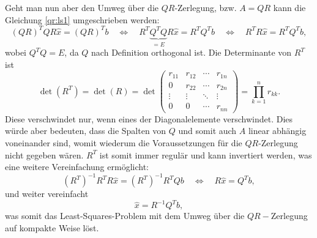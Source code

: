Geht man nun aber den Umweg über die $QR$-Zerlegung, bzw. $A=QR$ kann die Gleichung \ref{qr:ls1} umgeschrieben werden:
\begin{equation*}
(QR)^TQR\hat{x}=(QR)^Tb \quad \Leftrightarrow \quad R^T\underbrace{Q^TQ}_{\displaystyle=E}R\hat{x}= R^TQ^Tb \quad \Leftrightarrow \quad
R^TR\hat{x}=R^TQ^Tb,
\end{equation*}
wobei $Q^TQ=E$, da $Q$ nach Definition orthogonal ist.
Die Determinante von $R^T$ ist
\begin{equation*}
\det(R^T)=\det(R)=\det
\begin{pmatrix}
r_{11}&r_{12}&\cdots &r_{1n}\\
0     &r_{22}&\cdots &r_{2n}\\
\vdots&\vdots&\ddots&\vdots\\
0&0&\cdots&r_{nn}
\end{pmatrix}=\prod_{k=1}^{n}r_{kk}.
\end{equation*}
Diese verschwindet nur, wenn eines der Diagonalelemente verschwindet.
Dies würde aber bedeuten, dass die Spalten von $Q$ und somit auch $A$ linear abhängig voneinander sind, womit wiederum die Voraussetzungen für die $QR$-Zerlegung nicht gegeben wären.
$R^T$ ist somit immer regulär und kann invertiert werden, was eine weitere Vereinfachung ermöglicht:
\begin{equation*}
(R^T)^{-1}R^TR\hat{x}=(R^T)^{-1}R^TQb\quad\Leftrightarrow\quad R\hat{x}=Q^Tb,
\end{equation*}
und weiter vereinfacht
\begin{equation}
\hat{x}=R^{-1}Q^Tb,
\end{equation}
was somit das Least-Squares-Problem mit dem Umweg über die $QR-$Zerlegung auf kompakte Weise löst.
